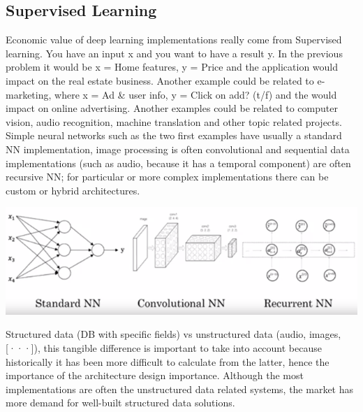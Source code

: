 \documentclass[11pt]{report}
\begin{document}
\subsection*{Supervised Learning}
Economic value of deep learning implementations really come from Supervised learning.
You have an input x and you want to have a result y. In the previous problem it would be x = Home features, y = Price and the application would impact on the real estate business. Another example could be related to e-marketing, where x = Ad \& user info, y = Click on add? (t/f) and the would impact on online advertising. Another examples could be related to computer vision, audio recognition, machine translation and other topic related projects. Simple neural networks such as the two first examples have usually a standard NN implementation, image processing is often convolutional and sequential data implementations (such as audio, because it has a temporal component) are often recursive NN; for particular or more complex implementations there can be custom or hybrid architectures.
\begin{center}
	\includegraphics[width = .50\textwidth]{NNE.png}
\end{center}
Structured data (DB with specific fields) vs unstructured data (audio, images, [···]), this tangible difference is important to take into account because historically it has been more difficult to calculate from the latter, hence the importance of the architecture design importance. Although the most  implementations are often the unstructured data related systems, the market has more demand for well-built structured data solutions.
\end{document}

